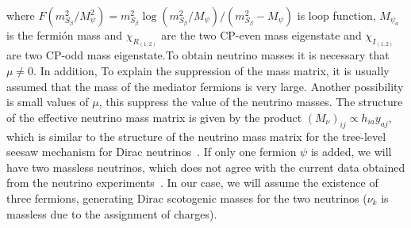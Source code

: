 \documentclass[12pt]{article}
\begin{document}
where $F(m_{S_{\beta}}^{2}/M_{\psi}^{2}) = m_{S_{\beta}}^{2}\log(m_{S_{\beta}}^{2}/M_{\psi})/(m_{S_{\beta}}^{2}-M_{\psi})$ is loop function, $M_{\psi_{a}}$ is the fermión mass  and $\chi_{R_{(1,2)}}$ are the two CP-even mass eigenstate and $\chi_{I_{(1,2)}}$ are two CP-odd mass eigenstate.To obtain neutrino masses it is necessary that $\mu \neq 0$. In addition, To explain the suppression of the mass matrix, it is usually assumed that the mass of the mediator fermions is very large. Another possibility is small values of $\mu$, this suppress the value of the neutrino masses. The structure of the effective neutrino mass matrix is given by the product $(M_{\nu})_{ij} \propto h_{i a} y_{a j}$, which is similar to the structure of the neutrino mass matrix for the tree-level seesaw mechanism for Dirac neutrinos~\cite{Chulia:2016ngi}. If only one fermion $\psi$ is added, we will have two massless neutrinos, which does not agree with the current data obtained from the neutrino experiments~\cite{deSalas:2017kay}. In our case, we will assume the existence of three fermions, generating Dirac scotogenic masses for the two neutrinos ($\nu_{k}$ is massless due to the assignment of charges).
\end{document}
